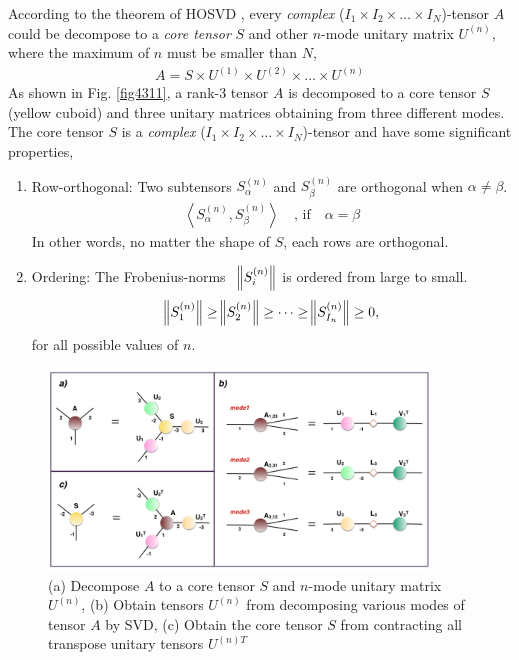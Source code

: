 According to the theorem of HOSVD \cite{}, every \textit{complex} ($ I_1 \times I_2 \times \dots \times I_N$)-tensor $A$ could be decompose to a \textit{core tensor} $S$ and other $n$-mode unitary matrix $U^{(n)}$, where the maximum of $n$ must be smaller than $N$,
\begin{align}
	A = S \times U^{(1)} \times U^{(2)} \times \dots \times U^{(n)}
\end{align} 
As shown in Fig. \ref{fig4311}, a rank-3 tensor $A$ is decomposed to a core tensor $S$ (yellow cuboid) and three unitary matrices obtaining from three different modes.  The core tensor $S$ is a \textit{complex} ($ I_1 \times I_2 \times \dots \times I_N$)-tensor and have some significant properties, \begin{enumerate}
	\item Row-orthogonal: Two subtensors $S_{\alpha}^{(n)}$ and $S_{\beta}^{(n)}$ are orthogonal when $\alpha \neq \beta$. 
		\begin{align}		
			\left\langle S^{(n)}_{\alpha},S^{(n)}_{\beta} \right\rangle \quad \text{, if} \quad \alpha = \beta
		\end{align}		
		In other words, no matter the shape of $S$, each rows are orthogonal.
	\item Ordering: The Frobenius-norms $\text{ } \norm{S^{(n)}_{i}} $ is ordered from large to small.
		\begin{align}		
			\norm{S^{(n)}_1} \geq \norm{S^{(n)}_2} \geq \dots \geq \norm{S^{(n)}_{I_n}} \geq 0,
		\end{align}		
		for all possible values of $n$.
\end{enumerate}
\begin{figure}[ht]
	\centering
	\includegraphics[width=0.90\textwidth]{figures/fig4312.png}
	\caption[The tensor-network representation of HOSVD]{(a) Decompose $A$ to a core tensor $S$ and $n$-mode unitary matrix $U^{(n)}$, (b) Obtain tensors $U^{(n)}$ from decomposing various modes of tensor $A$ by SVD, (c) Obtain the core tensor $S$ from contracting all transpose unitary tensors $U^{(n)T}$ }
	\label{fig4312}
\end{figure}
